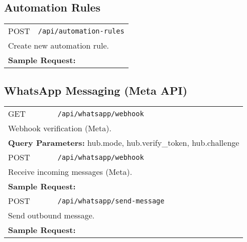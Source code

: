 \documentclass[11pt,a4paper]{article}
\begin{document}
\subsection{Automation Rules}
\begin{longtable}{p{2.5cm}p{10cm}}
POST & \texttt{/api/automation-rules} \\
\multicolumn{2}{p{13cm}}{Create new automation rule.} \\
\multicolumn{2}{p{13cm}}{\textbf{Sample Request:}}
\begin{lstlisting}[language=json]
{"name":"Hot lead message","coachId":"64f1a2b3c4d5e6f7a8b9c0d1","triggerEvent":"lead_temperature_changed","actions":[{"type":"send_whatsapp_message","config":{"message":"Hi {{leadData.name}}"}}]}
\end{lstlisting} \\
\end{longtable}

\subsection{WhatsApp Messaging (Meta API)}
\begin{longtable}{p{2.5cm}p{10cm}}
GET & \texttt{/api/whatsapp/webhook} \\
\multicolumn{2}{p{13cm}}{Webhook verification (Meta).} \\
\multicolumn{2}{p{13cm}}{\textbf{Query Parameters:} hub.mode, hub.verify_token, hub.challenge} \\
POST & \texttt{/api/whatsapp/webhook} \\
\multicolumn{2}{p{13cm}}{Receive incoming messages (Meta).} \\
\multicolumn{2}{p{13cm}}{\textbf{Sample Request:}}
\begin{lstlisting}[language=json]
{"entry":[{"changes":[{"value":{"messages":[{"from":"911234567890","text":{"body":"Hi"},"type":"text"}],"metadata":{"phone_number_id":"..."}}}]}]}
\end{lstlisting} \\
POST & \texttt{/api/whatsapp/send-message} \\
\multicolumn{2}{p{13cm}}{Send outbound message.} \\
\multicolumn{2}{p{13cm}}{\textbf{Sample Request:}}
\begin{lstlisting}[language=json]
{"coachId":"64f1a2b3c4d5e6f7a8b9c0d1","recipientPhoneNumber":"911234567890","messageContent":"Hello!"}
\end{lstlisting} \\
\end{longtable}
\end{document}
